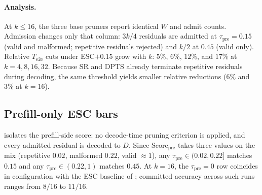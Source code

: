 \paragraph{Analysis.}
At $k\le16$, the three base pruners report identical $W$ and admit counts.
Admission changes only that column: $3k/4$ residuals are admitted at $\tau_{\mathrm{pre}}{=}0.15$
(valid and malformed; repetitive residuals rejected) and $k/2$ at $0.45$ (valid only).
Relative $T_{\mathrm{e2e}}$ cuts under ESC${+}0.15$ grow with $k$:
$5\%$, $6\%$, $12\%$, and $17\%$ at $k{=}4,8,16,32$.
Because SR and DPTS already terminate repetitive residuals during decoding, the same threshold yields smaller relative reductions
($6\%$ and $3\%$ at $k{=}16$).

\subsection{Prefill-only ESC bars}
\label{sec:ablate-prefill}

 isolates the prefill-side score: no decode-time pruning criterion is applied, and every admitted residual is decoded to $D$.
Since $\mathrm{Score}_{\mathrm{pre}}$ takes three values on the mix (repetitive $0.02$, malformed $0.22$, valid $\approx1$), any $\tau_{\mathrm{pre}}\in(0.02,0.22]$ matches $0.15$ and any $\tau_{\mathrm{pre}}\in(0.22,1)$ matches $0.45$.
At $k{=}16$, the $\tau_{\mathrm{pre}}{=}0$ row coincides in configuration with the ESC baseline of ; committed accuracy across such runs ranges from $8/16$ to $11/16$.

